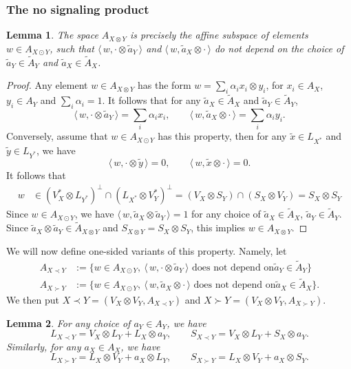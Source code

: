 \documentclass[12pt]{article}
\newtheorem{lemma}{Lemma}
\theoremstyle{definition}
\theoremstyle{remark}
\def\<{\langle\,}
\def\>{\,\rangle}
\begin{document}
\subsubsection{The no signaling product} 

\begin{lemma}\label{lemma:otimes_odot}
The space $A_{X\otimes Y}$ is precisely the affine subspace of elements $w\in A_{X\odot Y}$,
such that $\<w,\cdot \otimes \tilde a_Y\>$ and $\<w,\tilde a_X\otimes \cdot\>$ do not
depend on the choice of $\tilde a_Y\in \tilde A_Y$ and $\tilde a_X\in \tilde A_X$.
\end{lemma}

\begin{proof} Any element $w\in A_{X\otimes Y}$ has the form $w=\sum_i\alpha_i x_i\otimes
y_i$, for $x_i\in A_X$, $y_i\in A_Y$ and $\sum_i\alpha_i=1$. It follows that for any
$\tilde a_X\in \tilde A_X$ and $\tilde a_Y\in \tilde A_Y$,
\[
\<w,\cdot\otimes \tilde a_Y\>=\sum_i\alpha_ix_i,\qquad \<w,\tilde a_X\otimes
\cdot\>=\sum_i\alpha_iy_i.
\]
Conversely, assume that $w\in A_{X\odot Y}$ has this property, then for any $\tilde x\in
L_{X^*}$ and
$\tilde y\in L_{Y^*}$, we have
\[
\<w,\cdot\otimes \tilde y\>=0,\qquad \<w,\tilde x\otimes \cdot\>=0.
\]
It follows that
\begin{align*}
w&\in (V_X^*\otimes L_{Y^*})^\perp\cap (L_{X^*}\otimes V_Y^*)^\perp=
(V_X\otimes S_Y)\cap (S_X\otimes V_Y)=S_X\otimes S_Y
\end{align*}
Since $w\in A_{X\odot Y}$, we have $\<w,\tilde a_X\otimes \tilde a_Y\>=1$ for any choice
of $\tilde a_X\in \tilde A_X$,  $\tilde a_Y\in \tilde A_Y$. Since $\tilde a_X\otimes
\tilde a_Y\in \tilde A_{X\otimes Y}$ and $S_{X\otimes Y}=S_X\otimes S_Y$, this implies
$w\in A_{X\otimes Y}$.

\end{proof}


We will now define one-sided variants of this property. Namely, let 
\begin{align*}
A_{X\prec Y}&:=\{w\in A_{X\odot Y},\ \<w,\cdot \otimes \tilde a_Y\>\text{ does not depend on
} \tilde a_Y\in \tilde A_Y\}\\
A_{X\succ Y}&:=\{w\in A_{X\odot Y},\ \<w,\tilde a_X \otimes \cdot\>\text{ does not depend on
} \tilde a_X\in \tilde A_X\}.
\end{align*}
We then put $X\prec Y=(V_X\otimes V_Y, A_{X\prec Y})$ and $X\succ Y=(V_X\otimes V_Y,
A_{X\succ Y})$.

\begin{lemma}\label{lemma:prec} For any choice of $a_Y\in A_Y$, we have
\[
L_{X\prec Y}=V_X\otimes L_Y+L_X\otimes a_Y,\qquad S_{X\prec Y} =V_X\otimes L_Y+S_X\otimes
a_Y.
\]
Similarly, for any $a_X\in A_X$, we have
\[
L_{X\succ Y}=L_X\otimes V_Y+a_X\otimes L_Y,\qquad S_{X\succ Y} =L_X\otimes V_Y+a_X\otimes
S_Y.
\]
\end{lemma}
\end{document}
